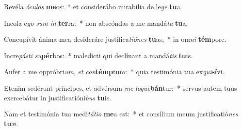 \item Revéla \textit{ó}\textit{cu}\textit{los} \textbf{me}os:~* et considerábo mirabília de le\textit{ge} \textbf{tu}a.
\item Incola e\textit{go} \textit{sum} \textit{in} \textbf{ter}ra:~* non abscóndas a me mandá\textit{ta} \textbf{tu}a.
\item Concupívit ánima mea desideráre justifica\textit{ti}\textit{ó}\textit{nes} \textbf{tu}as,~* in om\textit{ni} \textbf{tém}pore.
\item Incre\textit{pás}\textit{ti} \textit{su}\textbf{pér}bos:~* maledícti qui declínant a mandá\textit{tis} \textbf{tu}is.
\item Aufer a me oppróbri\textit{um}, \textit{et} \textit{con}\textbf{témp}tum:~* quia testimónia tua ex\textit{qui}\textbf{sí}vi.
\item Etenim sedérunt príncipes, et advérsum \textit{me} \textit{lo}\textit{que}\textbf{bán}tur:~* servus autem tuus exercebátur in justificatióni\textit{bus} \textbf{tu}is.
\item Nam et testimónia tua medi\textit{tá}\textit{ti}\textit{o} \textbf{me}a est:~* et consílium meum justificatió\textit{nes} \textbf{tu}æ.
